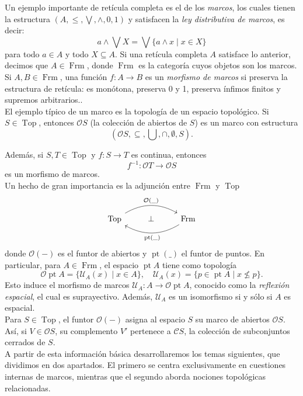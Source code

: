 \documentclass[12pt]{article}
\DeclareMathOperator{\Frm}{Frm}
\DeclareMathOperator{\Top}{Top}
\DeclareMathOperator{\pt}{pt}
\begin{document}
Un ejemplo importante de retícula completa es el de los \emph{marcos}, los cuales tienen la estructura $(A, \leq, \bigvee, \wedge, 0, 1)$ y
satisfacen la \emph{ley distributiva de marcos}, es decir: 
\[
a\wedge\bigvee X=\bigvee\{a\wedge x\mid x\in X\}
\]
para todo $a\in A$ y todo $X\subseteq A$. Si una retícula completa $A$ satisface lo anterior, decimos que $A\in \Frm$, donde $\Frm$ es la categoría 
cuyos objetos son los marcos.\\

Si $A, B\in \Frm$, una función $f\colon A\to B$ es un \emph{morfismo de marcos} si preserva la estructura de retícula: es monótona,
preserva 0 y 1, preserva ínfimos finitos y supremos arbitrarios..\\

El ejemplo típico de un marco es la topología de un espacio topológico. Si $S\in \Top$, entonces $\mathcal{O}S$ (la colección de abiertos de $S$) 
es un marco con estructura 
\[
(\mathcal{O}S, \subseteq, \bigcup, \cap, \emptyset, S).
\]

Además, si $S, T\in \Top$ y $f\colon S\to T$ es continua, entonces
\[
f^{-1}\colon \mathcal{O}T\to \mathcal{O}S
\] 
es un morfismo de marcos.\\

Un hecho de gran importancia es la adjunción entre $\Frm$ y $\Top$
\[\begin{tikzcd}
\Top \arrow[rr, "\mathcal{O}(\_)", bend left] & \perp & \Frm \arrow[ll, "\pt(\_)", bend left]
\end{tikzcd}
\]
donde $\mathcal{O}(-)$ es el funtor de abiertos y $\pt(\_)$ el funtor de puntos. En particular, para $A\in \Frm$, el espacio $\pt A$ tiene como topología
\[
\mathcal{O}\pt A=\{\mathcal{U}_A(x)\mid x\in A\},\quad \mathcal{U}_A(x)=\{p\in \pt A\mid x\nleq p\}.
\]
Esto induce el morfismo de marcos $\mathcal{U}_A\colon A\to \mathcal{O}\pt A$, conocido como la \emph{reflexión espacial},
el cual es suprayectivo. Además, $\mathcal{U}_A$ es un isomorfismo si y sólo si $A$ es espacial.\\

Para $S\in\Top$, el funtor $\mathcal{O}(-)$ asigna al espacio $S$ su marco de abiertos $\mathcal{O}S$.
Así, si $V\in \mathcal{O}S$, su complemento $V'$ pertenece a $\mathcal{C}S$, la colección de subconjuntos cerrados de $S$.\\

A partir de esta información básica desarrollaremos los temas siguientes, que dividimos en dos apartados.
El primero se centra exclusivamente en cuestiones internas de marcos, mientras que el segundo aborda nociones topológicas 
relacionadas.\\
\end{document}
